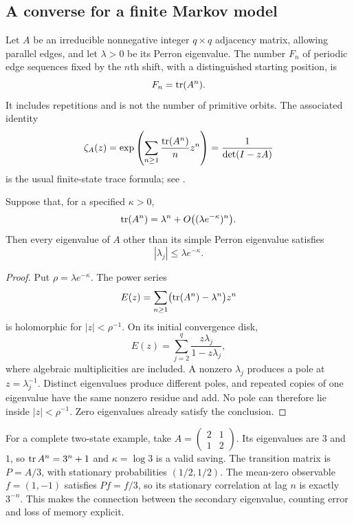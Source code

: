 \subsection{A converse for a finite Markov model}
\label{subsec:countmixfinite}

Let $A$ be an irreducible nonnegative integer $q\times q$ adjacency
matrix, allowing parallel edges, and let $\lambda>0$ be its Perron
eigenvalue. The number $F_n$ of periodic edge sequences fixed by the
$n$th shift, with a distinguished starting position, is
\[
 F_n=\operatorname{tr}(A^n).
\]
It includes repetitions and is not the number of primitive orbits.
The associated identity
\[
 \zeta_A(z)=
 \exp\left(\sum_{n\geq1}\frac{\operatorname{tr}(A^n)}n z^n\right)
 =\frac1{\det(I-zA)}
\]
is the usual finite-state trace formula; see
\cite[Sections 1 and 4]{SharpZeta}.

\begin{proposition}
\label{prop:countmixfinite}
Suppose that, for a specified $\kappa>0$,
\begin{equation}
 \operatorname{tr}(A^n)=\lambda^n+
          O\bigl((\lambda e^{-\kappa})^n\bigr).
 \label{eq:countmixtrace}
\end{equation}
Then every eigenvalue of $A$ other than its simple Perron eigenvalue
satisfies
\begin{equation}
 |\lambda_j|\leq\lambda e^{-\kappa}.
 \label{eq:countmixgap}
\end{equation}
\end{proposition}

\begin{proof}
Put $\rho=\lambda e^{-\kappa}$. The power series
\[
 E(z)=\sum_{n\geq1}\bigl(\operatorname{tr}(A^n)-\lambda^n\bigr)z^n
\]
is holomorphic for $|z|<\rho^{-1}$. On its initial convergence disk,
\[
 E(z)=\sum_{j=2}^q\frac{z\lambda_j}{1-z\lambda_j},
\]
where algebraic multiplicities are included. A nonzero $\lambda_j$
produces a pole at $z=\lambda_j^{-1}$. Distinct eigenvalues produce
different poles, and repeated copies of one eigenvalue have the same
nonzero residue and add. No pole can therefore lie inside
$|z|<\rho^{-1}$. Zero eigenvalues already satisfy the conclusion.
\end{proof}

For a complete two-state example, take
$A=\left(\begin{smallmatrix}2&1\\1&2\end{smallmatrix}\right)$.
Its eigenvalues are $3$ and $1$, so $\operatorname{tr} A^n=3^n+1$ and
$\kappa=\log3$ is a valid saving. The transition matrix is
$P=A/3$, with stationary probabilities $(1/2,1/2)$.
The mean-zero observable $f=(1,-1)$ satisfies $Pf=f/3$,
so its stationary correlation at lag $n$ is exactly $3^{-n}$.
This makes the connection between the secondary eigenvalue,
counting error and loss of memory explicit.

